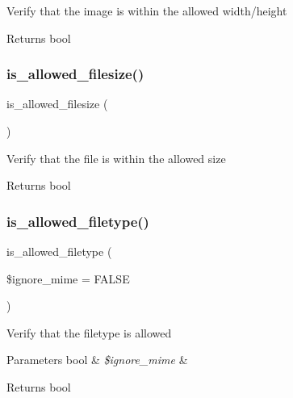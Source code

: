 Verify that the image is within the allowed width/height

\begin{DoxyReturn}{Returns}
bool 
\end{DoxyReturn}
\mbox{\label{class_c_i___upload_aa1283241c3b2fc700c7b577beecd5f97}} 
\subsubsection{\texorpdfstring{is\+\_\+allowed\+\_\+filesize()}{is\_allowed\_filesize()}}
{\footnotesize\ttfamily is\+\_\+allowed\+\_\+filesize (\begin{DoxyParamCaption}{ }\end{DoxyParamCaption})}

Verify that the file is within the allowed size

\begin{DoxyReturn}{Returns}
bool 
\end{DoxyReturn}
\mbox{\label{class_c_i___upload_a248e8cef69fc954953dc988e8d82afca}} 
\subsubsection{\texorpdfstring{is\+\_\+allowed\+\_\+filetype()}{is\_allowed\_filetype()}}
{\footnotesize\ttfamily is\+\_\+allowed\+\_\+filetype (\begin{DoxyParamCaption}\item[{}]{\$ignore\+\_\+mime = {\ttfamily FALSE} }\end{DoxyParamCaption})}

Verify that the filetype is allowed


\begin{DoxyParams}[1]{Parameters}
bool & {\em \$ignore\+\_\+mime} & \\
\hline
\end{DoxyParams}
\begin{DoxyReturn}{Returns}
bool 
\end{DoxyReturn}
\mbox{\label{class_c_i___upload_af6f513bc693e3ba836f23fe9bebc6427}} 
